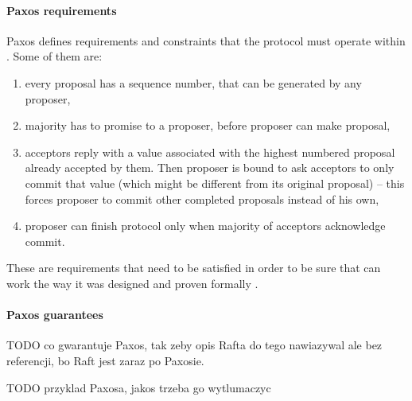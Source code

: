 \paragraph{Paxos requirements}
Paxos defines requirements and constraints that the protocol must operate within \cite{lamport2001paxosMadeSimple}. Some of them are: \begin{enumerate}
  \item every proposal has a sequence number, that can be generated by any proposer,
  \item majority has to promise to a proposer, before proposer can make proposal,
  \item acceptors reply with a value associated with the highest numbered proposal already accepted by them. Then proposer is bound to ask acceptors to only commit that value (which might be different from its original proposal) -- this forces proposer to commit other completed proposals instead of his own,\label{sec:mpp:requirements:finishInProgress}
  \item proposer can finish protocol only when majority of acceptors acknowledge commit.
\end{enumerate}
These are requirements that need to be satisfied in order to be sure that \paxos can work the way it was designed and proven formally \cite{Lamport1998partTimeParliment}. 

\paragraph{Paxos guarantees}
\label{sec:theory:paxos:guarantees}
TODO co gwarantuje Paxos, tak zeby opis Rafta do tego nawiazywal ale bez referencji, bo Raft jest zaraz po Paxosie.

\begin{example}

	TODO przyklad Paxosa, jakos trzeba go wytlumaczyc

\end{example}





